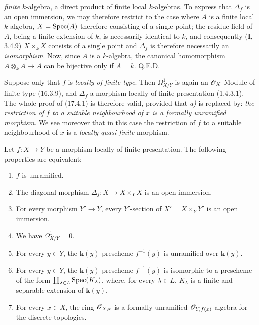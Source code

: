 \emph{finite} $k$-algebra, a direct product of finite local $k$-algebras. To express that $\Delta_f$ is an open immersion, we may therefore restrict to the case where $A$ is a finite local $k$-algebra, $X=\operatorname{Spec}(A)$ therefore consisting of a single point; the residue field of $A$, being a finite extension of $k$, is necessarily identical to $k$, and consequently (\textbf{I}, 3.4.9) $X\times_k X$ consists of a single point and $\Delta_f$ is therefore necessarily an \emph{isomorphism}. Now, since $A$ is a $k$-algebra, the canonical homomorphism $A\otimes_k A\to A$ can be bijective only if $A=k$. Q.E.D.

\begin{remark}[17.4.1.2]
\label{IV.17.4.1.2}
Suppose only that $f$ is \emph{locally of finite type}. Then $\varOmega^1_{X/Y}$ is again an $\mathscr{O}_X$-Module of finite type (16.3.9), and $\Delta_f$ a morphism locally of finite presentation (1.4.3.1). The whole proof of (17.4.1) is therefore valid, provided that \emph{a)} is replaced by: \emph{the restriction of $f$ to a suitable neighbourhood of $x$ is a formally unramified morphism}. We see moreover that in this case the restriction of $f$ to a suitable neighbourhood of $x$ is a \emph{locally quasi-finite} morphism.
\end{remark}

\begin{corollary}[17.4.2]
\label{IV.17.4.2}
Let $f:X\to Y$ be a morphism locally of finite presentation. The following properties are equivalent:
\begin{enumerate}
  \item[\textup{a)}] $f$ is unramified.
  \item[\textup{b)}] The diagonal morphism $\Delta_f:X\to X\times_Y X$ is an open immersion.
  \item[\textup{b$'$)}] For every morphism $Y'\to Y$, every $Y'$-section of $X'=X\times_Y Y'$ is an open immersion.
  \item[\textup{c)}] We have $\varOmega^1_{X/Y}=0$.
  \item[\textup{d)}] For every $y\in Y$, the $\boldsymbol{k}(y)$-prescheme $f^{-1}(y)$ is unramified over $\boldsymbol{k}(y)$.
  \item[\textup{d$'$)}] For every $y\in Y$, the $\boldsymbol{k}(y)$-prescheme $f^{-1}(y)$ is isomorphic to a prescheme of the form $\coprod_{\lambda\in L}\operatorname{Spec}(K_\lambda)$, where, for every $\lambda\in L$, $K_\lambda$ is a finite and separable extension of $\boldsymbol{k}(y)$.
  \item[\textup{e)}] For every $x\in X$, the ring $\mathscr{O}_{X,x}$ is a formally unramified $\mathscr{O}_{Y,f(x)}$-algebra for the discrete topologies.
\end{enumerate}
\end{corollary}

